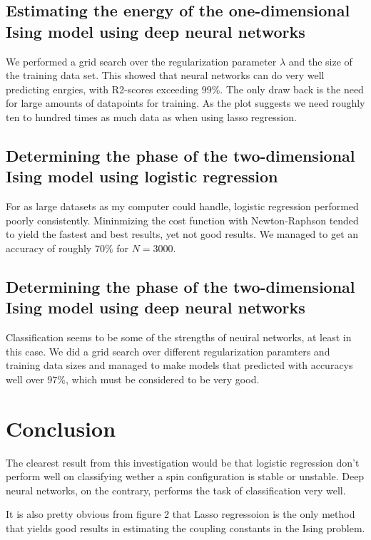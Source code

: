 \documentclass[a4paper,english]{article}
\begin{document}
\subsection{Estimating the energy of the one-dimensional 
Ising model using deep neural networks}
We performed a grid search over the regularization parameter $\lambda$
and the size of the training data set. This showed that 
neural networks can do very well predicting enrgies, 
with R2-scores exceeding $99\%$. The only draw back is the need for 
large amounts of datapoints for training. As the plot suggests we
need roughly ten to hundred times as much data as when using
lasso regression.

\subsection{Determining the phase of the two-dimensional Ising model using
logistic regression}
For as large datasets as my computer could handle, logistic regression
performed poorly consistently. Mininmizing the cost function with 
Newton-Raphson tended to yield the fastest and best results, yet
not good results. We managed to get an accuracy of roughly $70\%$ 
for $N=3000$. 

\subsection{Determining the phase of the two-dimensional Ising model using
deep neural networks}
Classification seems to be some of the strengths of neuiral networks, at
least in this case. We did a grid search over different regularization
paramters and training data sizes and managed to make models that
predicted with accuracys well over $97\%$, which must be considered to
be very good.

\section{Conclusion}
The clearest result from this investigation would be that logistic
regression don't perform well on classifying wether a spin
configuration is stable or unstable. Deep neural networks, on the contrary,
performs the task of classification very well.
\par
It is also pretty obvious from figure 2 that Lasso regressoion is the 
only method that yields good results in estimating the coupling constants
in the Ising problem.
{}

\end{document}
